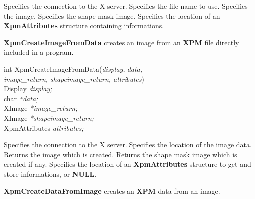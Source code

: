 \begin{description}

 Specifies the connection to the X server.
 Specifies the file name to use.
 Specifies the image.
 Specifies the shape mask image.
 Specifies the location of an {\bf XpmAttributes} structure
containing informations.

\end{description} 

\vspace{.5cm}
{\bf XpmCreateImageFromData} creates an image from an {\bf XPM} file directly included in a program.

\begin{flushleft} 

int XpmCreateImageFromData({\it display, data, \\
\hspace{3cm}image\_return, shapeimage\_return, attributes})\\

\hspace{1cm}Display {\it *display;}\\
\hspace{1cm}char {\it **data;}\\
\hspace{1cm}XImage {\it **image\_return;}\\
\hspace{1cm}XImage {\it **shapeimage\_return;}\\
\hspace{1cm}XpmAttributes {\it *attributes;}

\end{flushleft}

\begin{description}

 Specifies the connection to the X server.
 Specifies the location of the image data.
 Returns the image which is created.
 Returns the shape mask image which is created if
any.
 Specifies the location of an {\bf XpmAttributes} structure
to get and store informations, or {\bf NULL}. 

\end{description} 

\vspace{.5cm}
{\bf XpmCreateDataFromImage} creates an {\bf XPM} data from an image.

